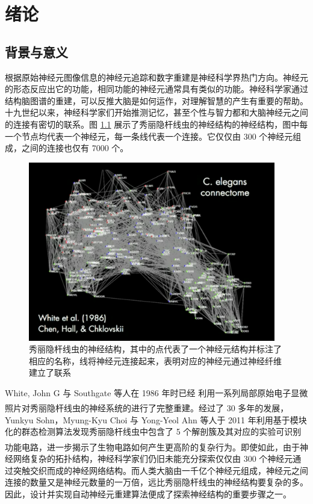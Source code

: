 \newcommand{\upcite}[1]{\textsuperscript{\textsuperscript{\cite{#1}}}}
\chapter{绪论}
\section{背景与意义}

根据原始神经元图像信息的神经元追踪和数字重建是神经科学界热门方向。神经元的形态反应出它的功能，相同功能的神经元通常具有类似的功能。神经科学家通过结构脑图谱的重建，可以反推大脑是如何运作，对理解智慧的产生有重要的帮助。十九世纪以来，神经科学家们开始推测记忆，甚至个性与智力都和大脑神经元之间的连接有密切的联系。图 \ref{worm} 展示了秀丽隐杆线虫的神经结构的神经结构，图中每一个节点均代表一个神经元，每一条线代表一个连接。它仅仅由 300 个神经元组成，之间的连接也仅有 7000 个。

\begin{figure}
\centering
\includegraphics[width=108mm]{images/worm}
\caption{秀丽隐杆线虫的神经结构，其中的点代表了一个神经元结构并标注了相应的名称，线将神经元连接起来，表明对应的神经元通过神经纤维建立了联系}
\label{worm}
\end{figure}

White, John G 与 Southgate 等人在 1986 年时已经 利用一系列局部原始电子显微照片对秀丽隐杆线虫的神经系统的进行了完整重建\upcite{white1986structure}。经过了 30 多年的发展，Yunkyu Sohn，Myung-Kyu Choi 与 Yong-Yeol Ahn 等人于 2011 年利用基于模块化的群态检测算法发现秀丽隐杆线虫中包含了 5 个解剖簇及其对应的实验可识别功能电路，进一步揭示了生物电路如何产生更高阶的复杂行为\upcite{varshney2011structural}。即使如此，由于神经网络复杂的拓扑结构，神经科学家们仍旧未能充分探索仅仅由 300 个神经元通过突触交织而成的神经网络结构。而人类大脑由一千亿个神经元组成，神经元之间连接的数量又是神经元数量的一万倍，远比秀丽隐杆线虫的神经结构要复杂的多。因此，设计并实现自动神经元重建算法便成了探索神经结构的重要步骤之一。

